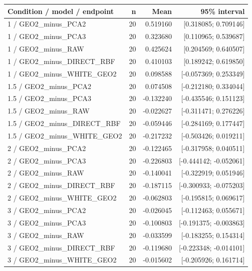 \begin{longtable}{p{.56\linewidth}rrr}
\toprule Condition / model / endpoint & n & Mean & 95\% interval\\\midrule
1 / GEO2\_minus\_PCA2 & 20 & 0.519160 & [0.318085; 0.709146] \\
1 / GEO2\_minus\_PCA3 & 20 & 0.323680 & [0.110965; 0.539687] \\
1 / GEO2\_minus\_RAW & 20 & 0.425624 & [0.204569; 0.640507] \\
1 / GEO2\_minus\_DIRECT\_RBF & 20 & 0.410103 & [0.189242; 0.619850] \\
1 / GEO2\_minus\_WHITE\_GEO2 & 20 & 0.098588 & [-0.057369; 0.253349] \\
1.5 / GEO2\_minus\_PCA2 & 20 & 0.074508 & [-0.212180; 0.334044] \\
1.5 / GEO2\_minus\_PCA3 & 20 & -0.132240 & [-0.435546; 0.151123] \\
1.5 / GEO2\_minus\_RAW & 20 & -0.022627 & [-0.311471; 0.276226] \\
1.5 / GEO2\_minus\_DIRECT\_RBF & 20 & -0.059446 & [-0.284169; 0.177447] \\
1.5 / GEO2\_minus\_WHITE\_GEO2 & 20 & -0.217232 & [-0.503426; 0.019211] \\
2 / GEO2\_minus\_PCA2 & 20 & -0.122465 & [-0.317958; 0.040511] \\
2 / GEO2\_minus\_PCA3 & 20 & -0.226803 & [-0.444142; -0.052061] \\
2 / GEO2\_minus\_RAW & 20 & -0.140041 & [-0.322919; 0.051946] \\
2 / GEO2\_minus\_DIRECT\_RBF & 20 & -0.187115 & [-0.300933; -0.075203] \\
2 / GEO2\_minus\_WHITE\_GEO2 & 20 & -0.062803 & [-0.195815; 0.069617] \\
3 / GEO2\_minus\_PCA2 & 20 & -0.026045 & [-0.112463; 0.055671] \\
3 / GEO2\_minus\_PCA3 & 20 & -0.100803 & [-0.191375; -0.003863] \\
3 / GEO2\_minus\_RAW & 20 & -0.033599 & [-0.183255; 0.154314] \\
3 / GEO2\_minus\_DIRECT\_RBF & 20 & -0.119680 & [-0.223348; -0.014101] \\
3 / GEO2\_minus\_WHITE\_GEO2 & 20 & -0.015602 & [-0.205926; 0.161714] \\
\bottomrule\end{longtable}
